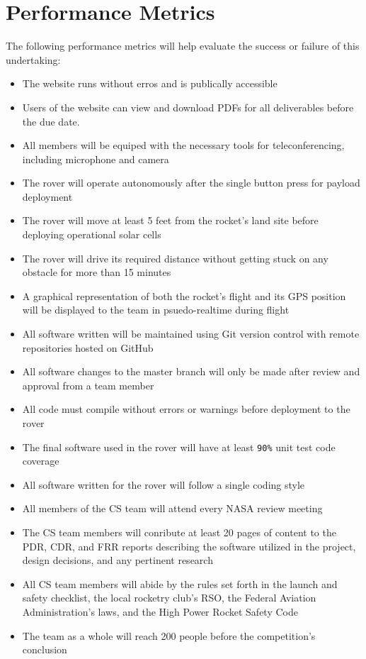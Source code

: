 \documentclass[onecolumn, draftclsnofoot,10pt, compsoc]{IEEEtran}
\begin{document}
\section{Performance Metrics}
The following performance metrics will help evaluate the success or failure of this undertaking:
\begin{itemize}
\item The website runs without erros and is publically accessible
\item Users of the website can view and download PDFs for all deliverables before the due date.
\item All members will be equiped with the necessary tools for teleconferencing, including microphone and camera
\item The rover will operate autonomously after the single button press for payload deployment
\item The rover will move at least 5 feet from the rocket's land site before deploying operational solar cells
\item The rover will drive its required distance without getting stuck on any obstacle for more than 15 minutes
\item A graphical representation of both the rocket's flight and its GPS position will be displayed to the team in psuedo-realtime during flight
\item All software written will be maintained using Git version control with remote repositories hosted on GitHub
\item All software changes to the master branch will only be made after review and approval from a team member
\item All code must compile without errors or warnings before deployment to the rover
\item The final software used in the rover will have at least \verb!90%! unit test code coverage
\item All software written for the rover will follow a single coding style
\item All members of the CS team will attend every NASA review meeting
\item The CS team members will conribute at least 20 pages of content to the PDR, CDR, and FRR reports describing the software utilized in the project, design decisions, and any pertinent research
\item All CS team members will abide by the rules set forth in the launch and safety checklist, the local rocketry club's RSO, the Federal Aviation Administration's laws, and the High Power Rocket Safety Code
\item The team as a whole will reach 200 people before the competition's conclusion
\end{itemize}
\end{document}
